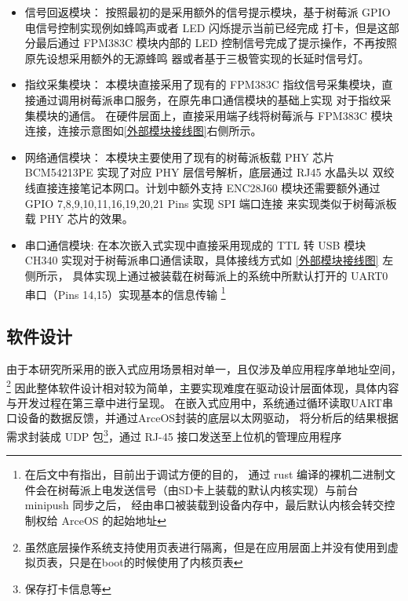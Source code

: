     \begin{itemize}
        \item 信号回返模块：
            按照最初的是采用额外的信号提示模块，基于树莓派 GPIO 电信号控制实现例如蜂鸣声或者 LED 闪烁提示当前已经完成
            打卡，但是这部分最后通过 FPM383C 模块内部的 LED 控制信号完成了提示操作，不再按照原先设想采用额外的无源蜂鸣
            器或者基于三极管实现的长延时信号灯。
        \item 指纹采集模块：
            本模块直接采用了现有的 FPM383C 指纹信号采集模块，直接通过调用树莓派串口服务，在原先串口通信模块的基础上实现
            对于指纹采集模块的通信。
            在硬件层面上，直接采用端子线将树莓派与 FPM383C 模块连接，连接示意图如\ref{外部模块接线图}右侧所示\cite{fpm383c-module-specification}。
        \item 网络通信模块：
            本模块主要使用了现有的树莓派板载 PHY 芯片 BCM54213PE 实现了对应 PHY 层信号解析，底层通过 RJ45 水晶头以
            双绞线直接连接笔记本网口。计划中额外支持 ENC28J60 模块还需要额外通过 GPIO 7,8,9,10,11,16,19,20,21 Pins 实现 SPI 端口连接
            来实现类似于树莓派板载 PHY 芯片的效果。
        \item 串口通信模块:
            在本次嵌入式实现中直接采用现成的 TTL 转 USB 模块 CH340 实现对于树莓派串口通信读取，具体接线方式如 \ref{外部模块接线图} 左侧所示，
            具体实现上通过被装载在树莓派上的系统中所默认打开的 UART0 串口（Pins 14,15）实现基本的信息传输
            \footnote{在后文中有指出，目前出于调试方便的目的，
            通过 rust 编译的裸机二进制文件会在树莓派上电发送信号（由SD卡上装载的默认内核实现）与前台 minipush 同步之后，
            经由串口被装载到设备内存中，最后默认内核会转交控制权给 ArceOS 的起始地址}
    \end{itemize}

\subsection{软件设计}

    由于本研究所采用的嵌入式应用场景相对单一，且仅涉及单应用程序单地址空间，
    \footnote{虽然底层操作系统支持使用页表进行隔离，但是在应用层面上并没有使用到虚拟页表，只是在boot的时候使用了内核页表}
    因此整体软件设计相对较为简单，主要实现难度在驱动设计层面体现，具体内容与开发过程在第三章中进行呈现。
    在嵌入式应用中，系统通过循环读取UART串口设备的数据反馈，并通过ArceOS封装的底层以太网驱动，
    将分析后的结果根据需求封装成 UDP 包\footnote{保存打卡信息等}，通过 RJ-45 接口发送至上位机的管理应用程序

